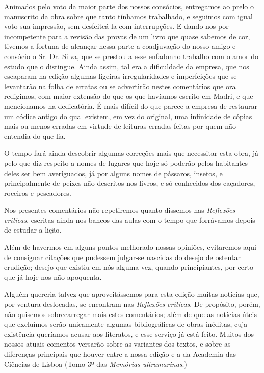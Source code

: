 Animados pelo voto da maior parte dos nossos consócios, 
entregamos ao prelo o manuscrito da obra sobre que tanto tínhamos 
trabalhado, e seguimos com igual voto sua impressão, sem desfeiteá-la 
com interrupções. E dando-nos por incompetente para a revisão das 
provas de um livro que quase sabemos de cor, tivemos a fortuna de 
alcançar nessa parte a coadjuvação do nosso amigo e consócio o Sr. Dr. 
Silva, que se prestou a esse enfadonho trabalho com o amor do estudo 
que o distingue. Ainda assim, tal era a dificuldade da empresa, que nos 
escaparam na edição algumas ligeiras irregularidades e imperfeições que 
se levantarão na folha de erratas ou se advertirão nestes comentários que 
ora redigimos, com maior extensão do que os que havíamos escrito em 
Madri, e que mencionamos na dedicatória. É mais difícil do que parece a 
empresa de restaurar um códice antigo do qual existem, em vez do 
original, uma infinidade de cópias mais ou menos erradas em virtude de 
leituras erradas feitas por quem não entendia do que lia.

O tempo fará ainda descobrir algumas correções mais que 
necessitar esta obra, já pelo que diz respeito a nomes de lugares que hoje 
só poderão pelos habitantes deles ser bem averiguados, já por 
alguns nomes de pássaros, insetos, e principalmente de peixes não 
descritos nos livros, e só conhecidos dos caçadores, roceiros e 
pescadores.

Nos presentes comentários não repetiremos quanto dissemos nas  \textit{Reflexões críticas}, 
escritas ainda nos bancos das aulas com o tempo que 
forrávamos depois de estudar a lição.

Além de havermos em alguns pontos melhorado nossas opiniões, 
evitaremos aqui de consignar citações que pudessem julgar-se nascidas 
do desejo de ostentar erudição; desejo que existiu em nós alguma vez, 
quando principiantes, por certo que já hoje nos não apoquenta.

Alguém quereria talvez que aproveitássemos para esta edição 
muitas notícias que, por ventura deslocadas, se encontram nas \textit{Reflexões críticas}. 
De propósito, porém, não quisemos sobrecarregar mais estes 
comentários; além de que as notícias úteis que excluímos serão 
unicamente algumas bibliográficas de obras inéditas, cuja existência 
queríamos acusar aos literatos, e esse serviço já está feito. Muitos dos 
nossos atuais comentos versarão sobre as variantes dos textos, e sobre as 
diferenças principais que houver entre a nossa edição e a da Academia 
das Ciências de Lisboa (Tomo 3º das \textit{Memórias ultramarinas}.)

